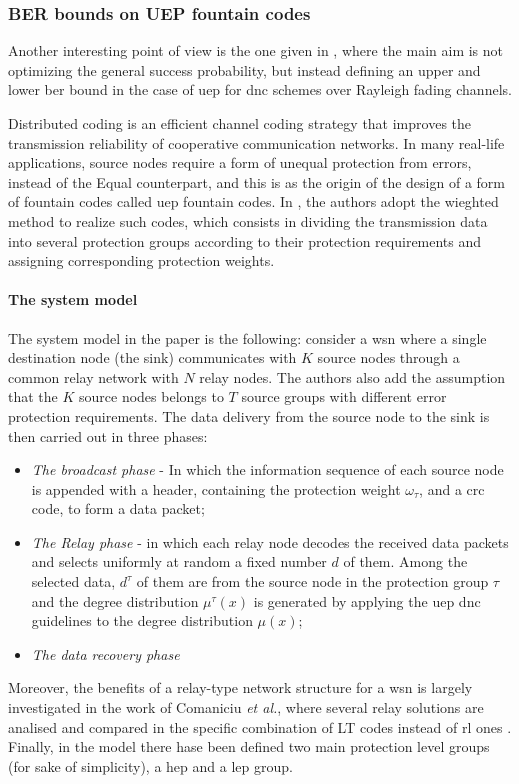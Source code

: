 \subsubsection{BER bounds on UEP fountain codes}
Another interesting point of view is the one given in \cite{Yue2014}, where the main aim is not optimizing the general success probability, but instead defining an upper and lower \gls{ber} bound in the case of \gls{uep} for \gls{dnc} schemes over Rayleigh fading channels.

Distributed coding is an efficient channel coding strategy that improves the transmission reliability of cooperative communication networks. In many real-life applications, source nodes require a form of unequal protection from errors, instead of the Equal counterpart, and this is as the origin of the design of a form of fountain codes called \gls{uep} fountain codes. In \cite{Yue2014}, the authors adopt the wieghted method to realize such codes, which consists in dividing the transmission data into several protection groups according to their protection requirements and assigning corresponding protection weights.

\paragraph{The system model}
The system model in the paper is the following: consider a \gls{wsn} where a single destination node (the sink) communicates with $K$ source nodes through a common relay network with $N$ relay nodes. The authors also add the assumption that the $K$ source nodes belongs to $T$ source groups with different error protection requirements. The data delivery from the source node to the sink is then carried out in three phases:
\begin{itemize}
  \item \textit{The broadcast phase} - In which the information sequence of each source node is appended with a header, containing the protection weight $\omega_\tau$, and a \gls{crc} code, to form a data packet;
  \item \textit{The Relay phase} - in which each relay node decodes the received data packets and selects uniformly at random a fixed number $d$ of them. Among the selected data, $d^\tau$ of them are from the source node in the protection group $\tau$ and the degree distribution $\mu^\tau(x)$ is generated by applying the \gls{uep} \gls{dnc} guidelines to the degree distribution $\mu(x)$;
  \item \textit{The data recovery phase}
\end{itemize}
Moreover, the benefits of a relay-type network structure for a \gls{wsn} is largely investigated in the work of Comaniciu \textit{et al.}, where several relay solutions are analised and compared in the specific combination of LT codes instead of \gls{rl} ones \cite{Comaniciu2011}.\\
Finally, in the model there hase been defined two main protection level groups (for sake of simplicity), a \gls{hep} and a \gls{lep} group.

